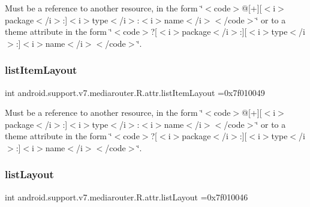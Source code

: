 Must be a reference to another resource, in the form \char`\"{}$<$code$>$@\mbox{[}+\mbox{]}\mbox{[}$<$i$>$package$<$/i$>$\+:\mbox{]}$<$i$>$type$<$/i$>$\+:$<$i$>$name$<$/i$>$$<$/code$>$\char`\"{} or to a theme attribute in the form \char`\"{}$<$code$>$?\mbox{[}$<$i$>$package$<$/i$>$\+:\mbox{]}\mbox{[}$<$i$>$type$<$/i$>$\+:\mbox{]}$<$i$>$name$<$/i$>$$<$/code$>$\char`\"{}. \mbox{\label{classandroid_1_1support_1_1v7_1_1mediarouter_1_1R_1_1attr_af5109bbc00fa0963f8746508b2e0d24b}} 
\subsubsection{\texorpdfstring{list\+Item\+Layout}{listItemLayout}}
{\footnotesize\ttfamily int android.\+support.\+v7.\+mediarouter.\+R.\+attr.\+list\+Item\+Layout =0x7f010049\hspace{0.3cm}{\ttfamily [static]}}

Must be a reference to another resource, in the form \char`\"{}$<$code$>$@\mbox{[}+\mbox{]}\mbox{[}$<$i$>$package$<$/i$>$\+:\mbox{]}$<$i$>$type$<$/i$>$\+:$<$i$>$name$<$/i$>$$<$/code$>$\char`\"{} or to a theme attribute in the form \char`\"{}$<$code$>$?\mbox{[}$<$i$>$package$<$/i$>$\+:\mbox{]}\mbox{[}$<$i$>$type$<$/i$>$\+:\mbox{]}$<$i$>$name$<$/i$>$$<$/code$>$\char`\"{}. \mbox{\label{classandroid_1_1support_1_1v7_1_1mediarouter_1_1R_1_1attr_a3e1b4d3a484b300077cba762ae959e8e}} 
\subsubsection{\texorpdfstring{list\+Layout}{listLayout}}
{\footnotesize\ttfamily int android.\+support.\+v7.\+mediarouter.\+R.\+attr.\+list\+Layout =0x7f010046\hspace{0.3cm}{\ttfamily [static]}}

